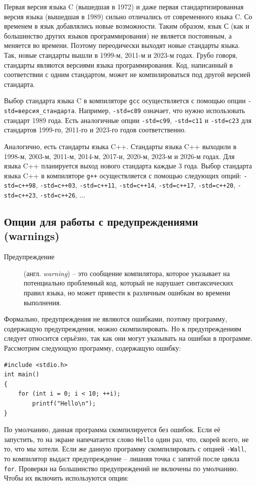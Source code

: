 \documentclass{article}
\begin{document}
Первая версия языка C (вышедшая в 1972) и даже первая стандартизированная версия языка (вышедшая в 1989) сильно отличались от современного языка C. Со временем в язык добавлялись новые возможности. Таким образом, язык С (как и большинство других языков программирования) не является постоянным, а меняется во времени. Поэтому переодически выходят новые стандарты языка. Так, новые стандарты вышли в 1999-м, 2011-м и 2023-м годах. Грубо говоря, стандарты являются версиями языка программирования. Код, написанный в соответствии с одним стандартом, может не компилироваться под другой версией стандарта.

Выбор стандарта языка C в компиляторе \texttt{gcc} осуществляется с помощью опции \texttt{-std=версия\_стандарта}. Например, \texttt{-std=c89} означает, что нужно использовать стандарт 1989 года. Есть аналогичные опции \texttt{-std=c99}, \texttt{-std=c11} и \texttt{-std=c23} для стандартов 1999-го, 2011-го и 2023-го годов соответственно.

Аналогично, есть стандарты языка C++. Стандарты языка C++ выходили в 1998-м, 2003-м, 2011-м, 2014-м, 2017-и, 2020-м, 2023-м и 2026-м годах. Для языка C++ планируется выход нового стандарта каждые 3 года. Выбор стандарта языка C++ в компиляторе \texttt{g++} осуществляется с помощью следующих опций: \texttt{-std=c++98}, \texttt{-std=c++03}, \texttt{-std=c++11}, \texttt{-std=c++14}, \texttt{-std=c++17}, \texttt{-std=c++20}, \texttt{-std=c++23}, \texttt{-std=c++26}, ...

\subsection*{Опции для работы с предупреждениями (warnings)}
\begin{description}
\item[Предупреждение] (англ. \textit{warning}) -- это сообщение компилятора, которое указывает на потенциально проблемный код, который не нарушает синтаксических правил языка, но может привести к различным ошибкам во времени выполнения.
\end{description}
Формально, предупреждения не являются ошибками, поэтому программу, содержащую предупреждения, можно скомпилировать. Но к предупреждениям следует относится серьёзно, так как они могут указывать на ошибки в программе. Рассмотрим следующую программу, содержащую ошибку:
\begin{lstlisting}[style=csMiptCppStyle]
#include <stdio.h>
int main()
{
    for (int i = 0; i < 10; ++i);
        printf("Hello\n");
}
\end{lstlisting}
По умолчанию, данная программа скомпилируется без ошибок. Если её запустить, то на экране напечатается слово \texttt{Hello} один раз, что, скорей всего, не то, что мы хотели. Если же данную программу скомпилировать с опцией \texttt{-Wall}, то компилятор выдаст предупреждение -- лишняя точка с запятой после цикла \texttt{for}. Проверки на большинство предупреждений не включены по умолчанию. Чтобы их включить используются опции:
\end{document}
